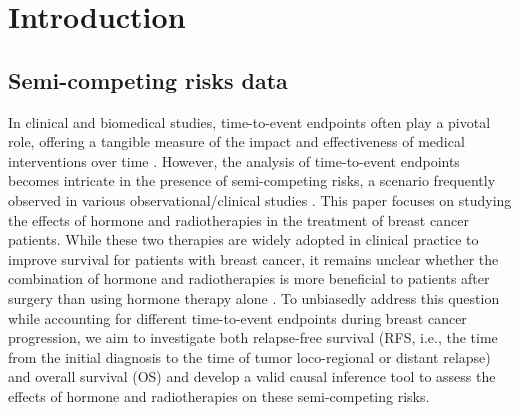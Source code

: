 \documentclass[APA,Times1COL]{WileyNJDv5} %
\theoremstyle{plain}
\begin{document}



\maketitle



\section{Introduction}



\label{s:intro}
\subsection{Semi-competing risks data}
 In clinical and biomedical studies, time-to-event endpoints often play a pivotal role, offering a tangible measure of the impact and effectiveness of medical interventions over time \citep{cohen2022clinical}. 
However, the analysis of time-to-event endpoints becomes intricate in the presence of semi-competing risks, a scenario frequently observed in various observational/clinical studies \citep{mao2021statistical}. This paper focuses on studying the effects of hormone and radiotherapies in the treatment of breast cancer patients. While these two therapies are widely adopted in clinical practice to improve survival for patients with breast cancer, it remains unclear whether the combination of hormone and radiotherapies is more beneficial to patients after surgery than using hormone therapy alone \citep{mayer2014,mcduff2022optimizing}. To unbiasedly address this question while accounting for different time-to-event endpoints during breast cancer progression, we aim to investigate both relapse-free survival (RFS, i.e., the time from the initial diagnosis to the time of tumor loco-regional or distant relapse) and overall survival (OS) and develop a valid causal inference tool to assess the effects of hormone and radiotherapies on these semi-competing risks.
\end{document}
